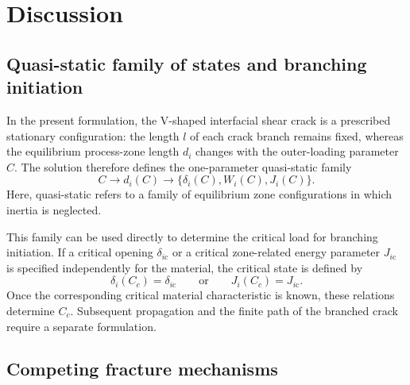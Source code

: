 \documentclass[pdflatex,onecolumn,sn-mathphys-ay]{sn-jnl}
\begin{document}
\section{Discussion}
\label{sec:discussion}

\subsection{Quasi-static family of states and branching initiation}
\label{subsec:discussion-quasistatic}

In the present formulation, the V-shaped interfacial shear crack is a
prescribed stationary configuration: the length $l$ of each crack branch
remains fixed, whereas the equilibrium process-zone length $d_i$ changes
with the outer-loading parameter $C$. The solution therefore defines the
one-parameter quasi-static family
\begin{equation*}
  C\longrightarrow d_i(C)
  \longrightarrow
  \bigl\{\delta_i(C),W_i(C),J_i(C)\bigr\}.
\end{equation*}
Here, quasi-static refers to a family of equilibrium zone configurations
in which inertia is neglected.

This family can be used directly to determine the critical load for
branching initiation. If a critical opening $\delta_{i\mathrm{c}}$ or a
critical zone-related energy parameter $J_{i\mathrm{c}}$ is specified
independently for the material, the critical state is defined by
\begin{equation*}
  \delta_i(C_c)=\delta_{i\mathrm{c}}
  \qquad\text{or}\qquad
  J_i(C_c)=J_{i\mathrm{c}}.
\end{equation*}
Once the corresponding critical material characteristic is known, these
relations determine $C_c$. Subsequent propagation and the finite path of
the branched crack require a separate formulation.

\subsection{Competing fracture mechanisms}
\label{subsec:discussion-competing}
\end{document}
